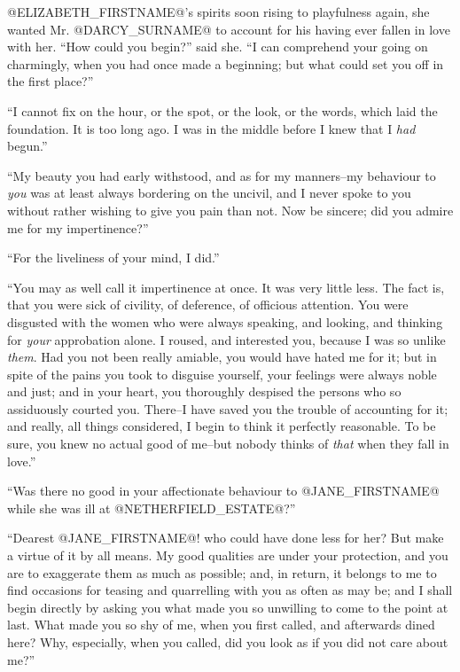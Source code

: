 @ELIZABETH_FIRSTNAME@'s spirits soon rising to playfulness again, she wanted Mr.
@DARCY_SURNAME@ to account for his having ever fallen in love with her. ``How could
you begin?'' said she. ``I can comprehend your going on charmingly, when
you had once made a beginning; but what could set you off in the first
place?''

``I cannot fix on the hour, or the spot, or the look, or the words, which
laid the foundation. It is too long ago. I was in the middle before I
knew that I \textit{had} begun.''

``My beauty you had early withstood, and as for my manners--my behaviour
to \textit{you} was at least always bordering on the uncivil, and I never spoke
to you without rather wishing to give you pain than not. Now be sincere;
did you admire me for my impertinence?''

``For the liveliness of your mind, I did.''

``You may as well call it impertinence at once. It was very little less.
The fact is, that you were sick of civility, of deference, of officious
attention. You were disgusted with the women who were always speaking,
and looking, and thinking for \textit{your} approbation alone. I roused, and
interested you, because I was so unlike \textit{them}. Had you not been really
amiable, you would have hated me for it; but in spite of the pains you
took to disguise yourself, your feelings were always noble and just; and
in your heart, you thoroughly despised the persons who so assiduously
courted you. There--I have saved you the trouble of accounting for
it; and really, all things considered, I begin to think it perfectly
reasonable. To be sure, you knew no actual good of me--but nobody thinks
of \textit{that} when they fall in love.''

``Was there no good in your affectionate behaviour to @JANE_FIRSTNAME@ while she was
ill at @NETHERFIELD_ESTATE@?''

``Dearest @JANE_FIRSTNAME@! who could have done less for her? But make a virtue of it
by all means. My good qualities are under your protection, and you are
to exaggerate them as much as possible; and, in return, it belongs to me
to find occasions for teasing and quarrelling with you as often as may
be; and I shall begin directly by asking you what made you so unwilling
to come to the point at last. What made you so shy of me, when you first
called, and afterwards dined here? Why, especially, when you called, did
you look as if you did not care about me?''

